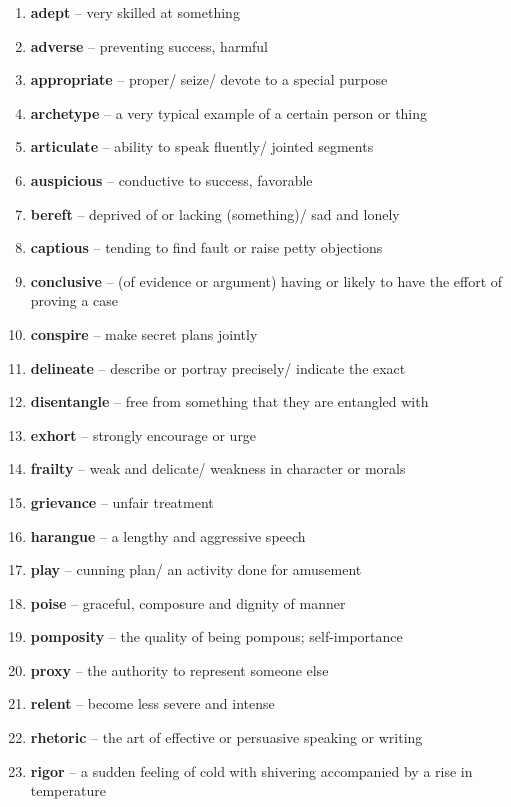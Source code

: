 \begin{enumerate}[wide,labelindent=0pt]
\item \textbf{adept} -- very skilled at something
\item \textbf{adverse} -- preventing success, harmful
\item \textbf{appropriate} -- proper/ seize/ devote to a special purpose
\item \textbf{archetype} -- a very typical example of a certain person or thing
\item \textbf{articulate} -- ability to speak fluently/ jointed segments
\item \textbf{auspicious} -- conductive to success, favorable
\item \textbf{bereft} -- deprived of or lacking (something)/ sad and lonely
\item \textbf{captious} -- tending to find fault or raise petty objections
\item \textbf{conclusive} -- (of evidence or argument) having or likely to have the effort of proving a case
\item \textbf{conspire} -- make secret plans jointly
\item \textbf{delineate} -- describe or portray precisely/ indicate the exact
\item \textbf{disentangle} -- free from something that they are entangled with
\item \textbf{exhort} -- strongly encourage or urge
\item \textbf{frailty} -- weak and delicate/ weakness in character or morals
\item \textbf{grievance} -- unfair treatment
\item \textbf{harangue} -- a lengthy and aggressive speech
\item \textbf{play} -- cunning plan/ an activity done for amusement
\item \textbf{poise} -- graceful, composure and dignity of manner
\item \textbf{pomposity} -- the quality of being pompous; self-importance
\item \textbf{proxy} -- the authority to represent someone else
\item \textbf{relent} -- become less severe and intense
\item \textbf{rhetoric} -- the art of effective or persuasive speaking or writing
\item \textbf{rigor} -- a sudden feeling of cold with shivering accompanied by a rise in temperature

\end{enumerate}
